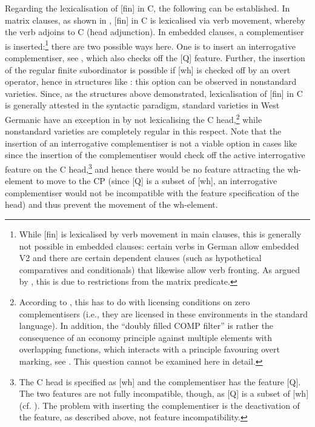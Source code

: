 \documentclass[output=paper,
modfonts, hidelinks, newtxmath
]{langscibook}
\begin{document}
Regarding the lexicalisation of [fin] in C, the following can be established. In matrix clauses, as shown in , [fin] in C is lexicalised via verb movement, whereby the verb adjoins to C (head adjunction). In embedded clauses, a complementiser is inserted:\footnote{While [fin] is lexicalised by verb movement in main clauses, this is generally not possible in embedded clauses: certain verbs in German allow embedded V2 and there are certain dependent clauses (such as hypothetical comparatives and conditionals) that likewise allow verb fronting. As argued by \citet{bacskaiatkaritoappear}, this is due to restrictions from the matrix predicate.} there are two possible ways here. One is to insert an interrogative complementiser, see , which also checks off the [Q] feature. Further, the insertion of the regular finite subordinator is possible if [wh] is checked off by an overt operator, hence in structures like : this option can be observed in nonstandard varieties. Since, as the structures above demonstrated, lexicalisation of [fin] in C is generally attested in the syntactic paradigm, standard varieties in West Germanic have an exception in  by not lexicalising the C head,\footnote{According to \citet{bacskaiatkaritoappear}, this has to do with licensing conditions on zero complementisers (i.e., they are licensed in these environments in the standard language). In addition, the ``doubly filled COMP filter'' is rather the consequence of an economy principle against multiple elements with overlapping functions, which interacts with a principle favouring overt marking, see \citet{vangelderen2009}. This question cannot be examined here in detail.} while nonstandard varieties are completely regular in this respect. Note that the insertion of an interrogative complementiser is not a viable option in cases like  since the insertion of the complementiser would check off the active interrogative feature on the C head,\footnote{The C head is specified as [wh] and the complementiser has the feature [Q]. The two features are not fully incompatible, though, as [Q] is a subset of [wh] (cf. \citealt{bayer2004}). The problem with inserting the complementiser is the deactivation of the feature, as described above, not feature incompatibility.} and hence there would be no feature attracting the wh-element to move to the CP (since [Q] is a subset of [wh], an interrogative complementiser would not be incompatible with the feature specification of the head) and thus prevent the movement of the wh-element.
\end{document}
